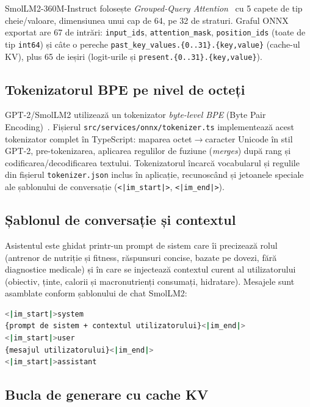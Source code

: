 \documentclass[12pt, a4paper, twoside]{report}
\numberwithin{equation}{section}
\begin{document}
SmolLM2-360M-Instruct folosește \textit{Grouped-Query Attention}~\cite{gqa} cu 5 capete de tip
cheie/valoare, dimensiunea unui cap de 64, pe 32 de straturi. Graful ONNX exportat are 67 de
intrări: \texttt{input\_ids}, \texttt{attention\_mask}, \texttt{position\_ids} (toate de tip
\texttt{int64}) și câte o pereche \texttt{past\_key\_values.\{0..31\}.\{key,value\}} (cache-ul
KV), plus 65 de ieșiri (logit-urile și \texttt{present.\{0..31\}.\{key,value\}}).

\subsection{Tokenizatorul BPE pe nivel de octeți}

GPT-2/SmolLM2 utilizează un tokenizator \textit{byte-level BPE} (Byte Pair Encoding)~\cite{bpe}.
Fișierul \texttt{src/\allowbreak services/\allowbreak onnx/\allowbreak tokenizer.ts} implementează acest tokenizator complet în
TypeScript: maparea octet$\rightarrow$caracter Unicode în stil GPT-2, pre-tokenizarea,
aplicarea regulilor de fuziune (\textit{merges}) după rang și codificarea/decodificarea
textului. Tokenizatorul încarcă vocabularul și regulile din fișierul \texttt{tokenizer.json}
inclus în aplicație, recunoscând și jetoanele speciale ale șablonului de conversație
(\texttt{<|im\_start|>}, \texttt{<|im\_end|>}).

\subsection{Șablonul de conversație și contextul}

Asistentul este ghidat printr-un prompt de sistem care îi precizează rolul (antrenor de
nutriție și fitness, răspunsuri concise, bazate pe dovezi, fără diagnostice medicale) și în
care se injectează contextul curent al utilizatorului (obiectiv, ținte, calorii și
macronutrienți consumați, hidratare). Mesajele sunt asamblate conform șablonului de chat
SmolLM2:

\begin{lstlisting}[language=bash, caption={Structura șablonului de conversație}]
<|im_start|>system
{prompt de sistem + contextul utilizatorului}<|im_end|>
<|im_start|>user
{mesajul utilizatorului}<|im_end|>
<|im_start|>assistant
\end{lstlisting}

\subsection{Bucla de generare cu cache KV}
\end{document}
